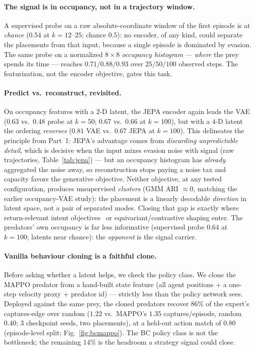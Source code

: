 \documentclass[11pt]{article}
\begin{document}
\paragraph{The signal is in occupancy, not in a trajectory window.}
A supervised probe on a raw absolute-coordinate window of the first episode is at
\emph{chance} ($0.54$ at $k{=}12$--$25$; chance $0.5$): no encoder, of any kind,
could separate the placements from that input, because a single episode is
dominated by evasion. The same probe on a normalized $8{\times}8$
\emph{occupancy histogram} --- \emph{where} the prey spends its time --- reaches
$0.71/0.88/0.93$ over $25/50/100$ observed steps. The featurization, not the
encoder objective, gates this task.

\paragraph{Predict vs.\ reconstruct, revisited.}
On occupancy features with a $2$-D latent, the JEPA encoder again leads the VAE
($0.63$ vs.\ $0.48$ probe at $k{=}50$; $0.67$ vs.\ $0.66$ at $k{=}100$), but with
a $4$-D latent the ordering \emph{reverses} ($0.81$ VAE vs.\ $0.67$ JEPA at
$k{=}100$). This delineates the principle from Part~1: JEPA's advantage comes
from \emph{discarding unpredictable detail}, which is decisive when the input
mixes evasion noise with signal (raw trajectories, Table~\ref{tab:jepa}) --- but
an occupancy histogram has \emph{already} aggregated the noise away, so
reconstruction stops paying a noise tax and capacity favors the generative
objective. Neither objective, at any tested configuration, produces
unsupervised \emph{clusters} (GMM ARI $\approx 0$, matching the earlier
occupancy-VAE study): the placement is a linearly decodable \emph{direction} in
latent space, not a pair of separated modes. Closing that gap is exactly where
return-relevant intent objectives~\cite{odrowaz2026gim} or
equivariant/contrastive shaping enter. The predators' own occupancy is far less
informative (supervised probe $0.64$ at $k{=}100$; latents near chance):
the \emph{opponent} is the signal carrier.

\paragraph{Vanilla behaviour cloning is a faithful clone.}
Before asking whether a latent helps, we check the policy class. We clone the
MAPPO predator from a hand-built state feature (all agent positions $+$ a
one-step velocity proxy $+$ predator id) --- strictly less than the policy
network sees. Deployed against the same prey, the cloned predators recover
$86\%$ of the expert's captures-edge over random ($1.22$ vs.\ MAPPO's $1.35$
captures/episode, random $0.40$; $3$ checkpoint seeds, two placements), at a
held-out action match of $0.80$ (episode-level split; Fig.~\ref{fig:bcmappo}).
The BC policy class is not the bottleneck; the
remaining $14\%$ is the headroom a strategy signal could close.
\end{document}
